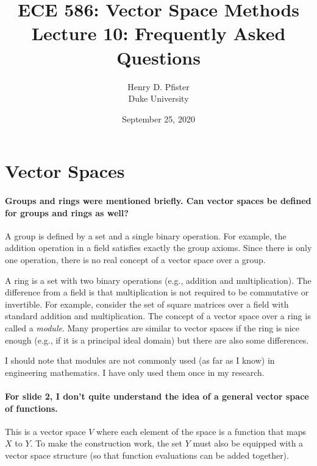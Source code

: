 \documentclass[10pt,english]{article}
\begin{document}
\title{ECE 586: Vector Space Methods \\ Lecture 10: Frequently Asked Questions}
\author{Henry D. Pfister \\ Duke University}
\date{September 25, 2020}

\maketitle

\section{Vector Spaces}

\paragraph{Groups and rings were mentioned briefly. Can vector spaces be defined for groups and rings as well?}

A group is defined by a set and a single binary operation.
For example, the addition operation in a field satisfies exactly the group axioms.
Since there is only one operation, there is no real concept of a vector space over a group.

A ring is a set with two binary operations (e.g., addition and multiplication).
The difference from a field is that multiplication is not required to be commutative or invertible.
For example, consider the set of square matrices over a field with standard addition and multiplication.
The concept of a vector space over a ring is called a \emph{module}.
Many properties are similar to vector spaces if the ring is nice enough (e.g., if it is a principal ideal domain) but there are also some differences.

I should note that modules are not commonly used (as far as I know) in engineering mathematics.
I have only used them once in my research.

\paragraph{For slide 2, I don't quite understand the idea of a general vector space of functions.}

This is a vector space $V$ where each element of the space is a function that maps $X$ to $Y$.
To make the construction work, the set $Y$ must also be equipped with a vector space structure (so that function evaluations can be added together).
\end{document}
